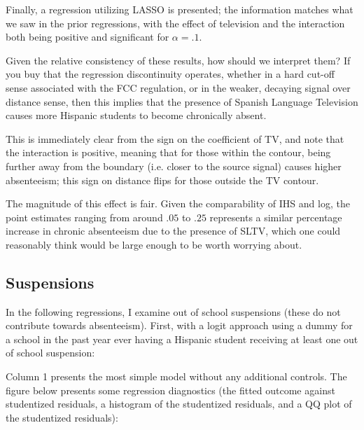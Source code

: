 \documentclass{article}
\begin{document}
Finally, a regression utilizing LASSO is presented; the information matches what we saw in the prior regressions, with the effect of television and the interaction both being positive and significant for $\alpha = .1$.

Given the relative consistency of these results, how should we interpret them? If you buy that the regression discontinuity operates, whether in a hard cut-off sense associated with the FCC regulation, or in the weaker, decaying signal over distance sense, then this implies that the presence of Spanish Language Television causes more Hispanic students to become chronically absent.

This is immediately clear from the sign on the coefficient of TV, and note that the interaction is positive, meaning that for those within the contour, being further away from the boundary (i.e. closer to the source signal) causes higher absenteeism; this sign on distance flips for those outside the TV contour.

The magnitude of this effect is fair. Given the comparability of IHS and log, the point estimates ranging from around $.05$ to $.25$ represents a similar percentage increase in chronic absenteeism due to the presence of SLTV, which one could reasonably think would be large enough to be worth worrying about. 



\clearpage

\subsection*{Suspensions}

In the following regressions, I examine out of school suspensions (these do not contribute towards absenteeism). First, with a logit approach using a dummy for a school in the past year ever having a Hispanic student receiving at least one out of school suspension: 


\clearpage

Column 1 presents the most simple model without any additional controls. The figure below presents some regression diagnostics (the fitted outcome against studentized residuals, a histogram of the studentized residuals, and a QQ plot of the studentized residuals): 
\end{document}
